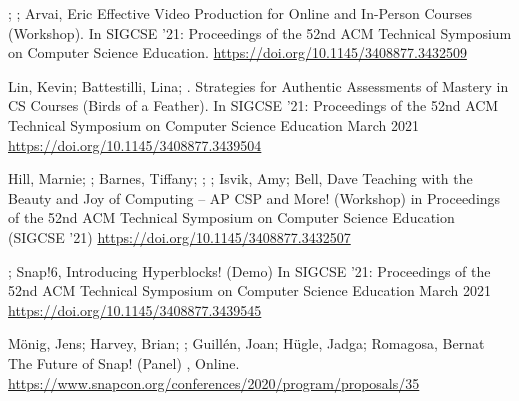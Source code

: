 \begin{etaremune}
    \item{\me; \dan; Arvai, Eric
    \newline Effective Video Production for Online and In-Person Courses (Workshop).
    \newline In SIGCSE '21: Proceedings of the 52nd ACM Technical Symposium on Computer Science Education.
    \newline
    \href{https://doi.org/10.1145/3408877.3432509}{https://doi.org/10.1145/3408877.3432509}}
    
    \item{Lin, Kevin; Battestilli, Lina; \me. Strategies for Authentic Assessments of Mastery in CS Courses (Birds of a Feather). \newline In SIGCSE '21: Proceedings of the 52nd ACM Technical Symposium on Computer Science Education March 2021
    \newline
    \href{https://doi.org/10.1145/3408877.3439504}{https://doi.org/10.1145/3408877.3439504}}
    
    \item{Hill, Marnie; \dan; Barnes, Tiffany; \lauren; \me; Isvik, Amy; Bell, Dave
    \newline Teaching with the Beauty and Joy of Computing – AP CSP and More! (Workshop)
    \newline in Proceedings of the 52nd ACM Technical Symposium on Computer Science Education (SIGCSE '21)
    \newline
    \href{https://doi.org/10.1145/3408877.3432507}{https://doi.org/10.1145/3408877.3432507}}

    \item{\dan; \me
    \newline Snap!6, Introducing Hyperblocks! (Demo)
    \newline In SIGCSE '21: Proceedings of the 52nd ACM Technical Symposium on Computer Science Education March 2021
    \newline
    \href{https://doi.org/10.1145/3408877.3439545}{https://doi.org/10.1145/3408877.3439545}}

    \item{Mönig, Jens; Harvey, Brian; \me;  Guillén, Joan; Hügle, Jadga; Romagosa, Bernat
    \newline
    The Future of Snap! (Panel)
    \newline {}, Online.
    \newline
    \href{https://www.snapcon.org/conferences/2020/program/proposals/35}{https://www.snapcon.org/conferences/2020/program/proposals/35}
    }
    

\end{etaremune}
